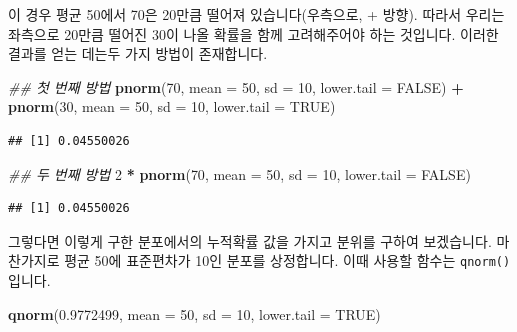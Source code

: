 \documentclass[]{book}
\newenvironment{Shaded}{\begin{snugshade}}{\end{snugshade}}
\newcommand{\CommentTok}[1]{\textcolor[rgb]{0.56,0.35,0.01}{\textit{#1}}}
\newcommand{\DataTypeTok}[1]{\textcolor[rgb]{0.13,0.29,0.53}{#1}}
\newcommand{\DecValTok}[1]{\textcolor[rgb]{0.00,0.00,0.81}{#1}}
\newcommand{\FloatTok}[1]{\textcolor[rgb]{0.00,0.00,0.81}{#1}}
\newcommand{\KeywordTok}[1]{\textcolor[rgb]{0.13,0.29,0.53}{\textbf{#1}}}
\newcommand{\NormalTok}[1]{#1}
\newcommand{\OperatorTok}[1]{\textcolor[rgb]{0.81,0.36,0.00}{\textbf{#1}}}
\newcommand{\OtherTok}[1]{\textcolor[rgb]{0.56,0.35,0.01}{#1}}
\newcommand{\StringTok}[1]{\textcolor[rgb]{0.31,0.60,0.02}{#1}}
\begin{document}
이 경우 평균 50에서 70은 20만큼 떨어져 있습니다(우측으로, + 방향). 따라서 우리는 좌측으로 20만큼 떨어진 30이 나올 확률을 함께 고려해주어야 하는 것입니다. 이러한 결과를 얻는 데는두 가지 방법이 존재합니다.

\begin{Shaded}
\begin{Highlighting}[]
\CommentTok{## 첫 번째 방법}
\KeywordTok{pnorm}\NormalTok{(}\DecValTok{70}\NormalTok{, }\DataTypeTok{mean =} \DecValTok{50}\NormalTok{, }\DataTypeTok{sd =} \DecValTok{10}\NormalTok{, }\DataTypeTok{lower.tail =} \OtherTok{FALSE}\NormalTok{) }\OperatorTok{+}\StringTok{ }
\StringTok{  }\KeywordTok{pnorm}\NormalTok{(}\DecValTok{30}\NormalTok{, }\DataTypeTok{mean =} \DecValTok{50}\NormalTok{, }\DataTypeTok{sd =} \DecValTok{10}\NormalTok{, }\DataTypeTok{lower.tail =} \OtherTok{TRUE}\NormalTok{)}
\end{Highlighting}
\end{Shaded}

\begin{verbatim}
## [1] 0.04550026
\end{verbatim}

\begin{Shaded}
\begin{Highlighting}[]
\CommentTok{## 두 번째 방법}
\DecValTok{2} \OperatorTok{*}\StringTok{ }\KeywordTok{pnorm}\NormalTok{(}\DecValTok{70}\NormalTok{, }\DataTypeTok{mean =} \DecValTok{50}\NormalTok{, }\DataTypeTok{sd =} \DecValTok{10}\NormalTok{, }\DataTypeTok{lower.tail =} \OtherTok{FALSE}\NormalTok{)}
\end{Highlighting}
\end{Shaded}

\begin{verbatim}
## [1] 0.04550026
\end{verbatim}

그렇다면 이렇게 구한 분포에서의 누적확률 값을 가지고 분위를 구하여 보겠습니다. 마찬가지로 평균 50에 표준편차가 10인 분포를 상정합니다. 이때 사용할 함수는 \texttt{qnorm()}입니다.

\begin{Shaded}
\begin{Highlighting}[]
\KeywordTok{qnorm}\NormalTok{(}\FloatTok{0.9772499}\NormalTok{, }\DataTypeTok{mean =} \DecValTok{50}\NormalTok{, }\DataTypeTok{sd =} \DecValTok{10}\NormalTok{, }\DataTypeTok{lower.tail =} \OtherTok{TRUE}\NormalTok{)}
\end{Highlighting}
\end{Shaded}
\end{document}
